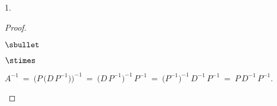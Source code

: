 \documentclass[11pt]{article}%
\begin{document}
\begin{noliste}{1.}
\begin{proof}
\begin{noliste}{$\sbullet$}
\begin{noliste}{$\stimes$}

      \item $A^{-1} \ = \ \Big( P \, \big( D \, P^{-1} \big)
        \Big)^{-1}
        \ = \ \big( D \, P^{-1} \big)^{-1} \, P^{-1}
        \ = \ \big( P^{-1} \big)^{-1} \, D^{-1} \, P^{-1}
        \ = \ P \, D^{-1} \, P^{-1}
        $.
      \end{noliste}


\end{noliste}
\end{proof}
\end{noliste}
\end{document}
